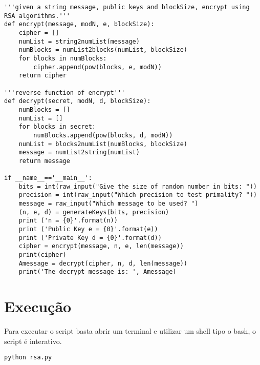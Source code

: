 \documentclass[a4paper,11pt]{article}
\theoremstyle{mytheor}
\begin{document}
\begin{lstlisting}[caption=RSA utilizando Miller Rabin em Python.]
'''given a string message, public keys and blockSize, encrypt using RSA algorithms.'''
def encrypt(message, modN, e, blockSize):
    cipher = []
    numList = string2numList(message)
    numBlocks = numList2blocks(numList, blockSize)
    for blocks in numBlocks:
        cipher.append(pow(blocks, e, modN))
    return cipher

'''reverse function of encrypt'''
def decrypt(secret, modN, d, blockSize):
    numBlocks = []
    numList = []
    for blocks in secret:
        numBlocks.append(pow(blocks, d, modN))
    numList = blocks2numList(numBlocks, blockSize)
    message = numList2string(numList)
    return message

if __name__=='__main__':
    bits = int(raw_input("Give the size of random number in bits: "))
    precision = int(raw_input("Which precision to test primality? "))
    message = raw_input("Which message to be used? ")
    (n, e, d) = generateKeys(bits, precision)
    print ('n = {0}'.format(n))
    print ('Public Key e = {0}'.format(e))
    print ('Private Key d = {0}'.format(d))
    cipher = encrypt(message, n, e, len(message))
    print(cipher)
    Amessage = decrypt(cipher, n, d, len(message))
    print('The decrypt message is: ', Amessage)
\end{lstlisting}

\section*{Execução}

Para executar o script basta abrir um terminal e utilizar um shell tipo o bash, o script é interativo.

\begin{lstlisting}[label={list:second},caption=Executando o script.]
python rsa.py
\end{lstlisting}
\end{document}

